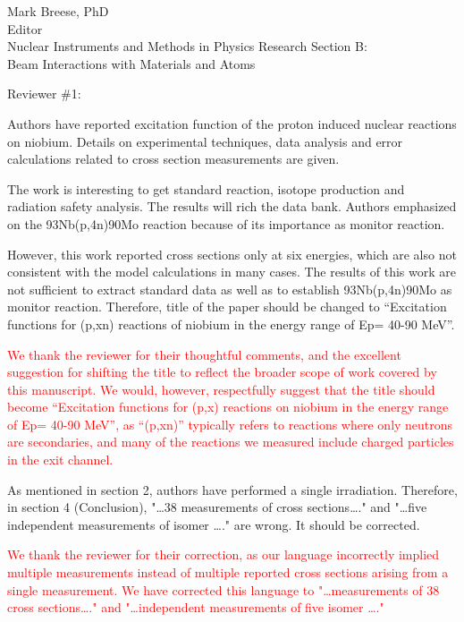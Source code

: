 \documentclass{letter} %
\newcommand{\colornote}[1]{\textcolor{red}{#1}}
\begin{document}
\begin{letter}{Mark Breese, PhD \\
Editor \\
Nuclear Instruments and Methods in Physics Research Section B: \\
Beam Interactions with Materials and Atoms}

  \vfill
  
 \pagebreak
 
 
 
 Reviewer \#1:
 
 Authors have reported excitation function of the proton induced nuclear reactions on niobium. Details on experimental techniques, data analysis and error calculations related to cross section measurements are given. 

The work is interesting to get standard reaction, isotope production and radiation safety analysis. The results will rich the data bank. Authors emphasized on the 93Nb(p,4n)90Mo reaction because of its importance as monitor reaction.  

However, this work reported cross sections only at six energies, which are also not consistent with the model calculations in many cases. The results of this work are not sufficient to extract standard data as well as to establish 93Nb(p,4n)90Mo as monitor reaction. Therefore, title of the paper should be changed to \enquote{Excitation functions for (p,xn) reactions of niobium in the energy range of Ep= 40-90 MeV}.

 \colornote{We thank the reviewer for their thoughtful comments, and the excellent suggestion for shifting the title to reflect the broader scope of work covered by this manuscript.  We would, however, respectfully suggest that the title should become \enquote{Excitation functions for (p,x) reactions on niobium in the energy range of Ep= 40-90 MeV}, as \enquote{(p,xn)} typically refers to reactions where only neutrons are secondaries, and many of the reactions we measured  include charged particles in the exit channel.}
 

As mentioned in section 2, authors have performed a single irradiation. Therefore, in section 4 (Conclusion), "\ldots 38 measurements of cross sections\ldots." and "\ldots five independent measurements of isomer \ldots." are wrong. It should be corrected.

\colornote{We  thank the reviewer for their  correction, as our language incorrectly implied multiple measurements instead of multiple reported cross sections arising from a single measurement. We have corrected this language to "\ldots  measurements of 38 cross sections\ldots." and "\ldots  independent measurements of five isomer \ldots."}


\end{letter}
\end{document}
